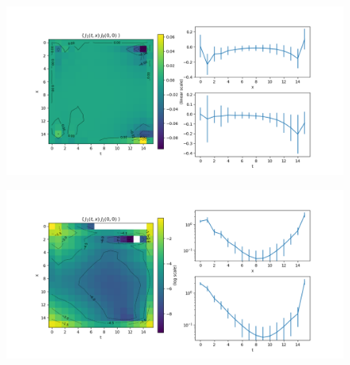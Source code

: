\documentclass{article}
\begin{document}
\begin{figure}[H]
    \centering
    \includegraphics[width=\textwidth]{../plots/V1V0.png}
    \caption{}
    \label{}
\end{figure}

\begin{figure}[H]
    \centering
    \includegraphics[width=\textwidth]{../plots/V1V1.png}
    \caption{}
    \label{}
\end{figure}
\end{document}
